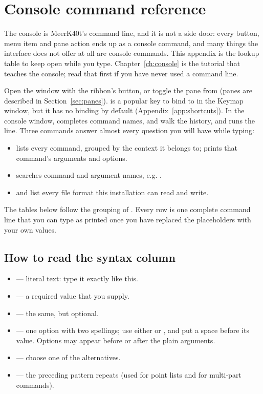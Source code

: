 \chapter{Console command reference}
\label{app:console}

The console is MeerK40t's command line, and it is not a side door: every button,
menu item and pane action ends up as a console command, and many things the
interface does not offer at all are console commands. This appendix is the lookup
table to keep open while you type. Chapter~\ref{ch:console} is the tutorial that
teaches the console; read that first if you have never used a command line.

Open the  window with the ribbon's  button, or toggle
the pane from  (panes are described in
Section~\ref{sec:panes}).  is a popular key to bind to
 in the Keymap window, but it has no binding by default
(Appendix~\ref{app:shortcuts}). In the
console window,  completes command names,  and  walk
the history, and  runs the line. Three commands answer almost every
question you will have while typing:

\begin{itemize}[leftmargin=1.4em]
  \item {} lists every command, grouped by the context it belongs to;
         prints that command's arguments and options.
  \item {} searches command and argument names, e.g.
        .
  \item {} and  list every file format this
        installation can read and write.
\end{itemize}

\noindent The tables below follow the grouping of . Every row is one
complete command line that you can type as printed once you have replaced the
placeholders with your own values.

\section*{How to read the syntax column}

\begin{itemize}[leftmargin=1.4em]
  \item {} --- literal text: type it exactly like this.
  \item {} --- a required value that you supply.
  \item \cmd{[<value>]} --- the same, but optional.
  \item {} --- one option with two spellings; use either
        \cmd{-} or , and put a space before its value. Options may
        appear before or after the plain arguments.
  \item {} --- choose one of the alternatives.
  \item {} --- the preceding pattern repeats (used for point lists and for
        multi-part commands).
\end{itemize}

